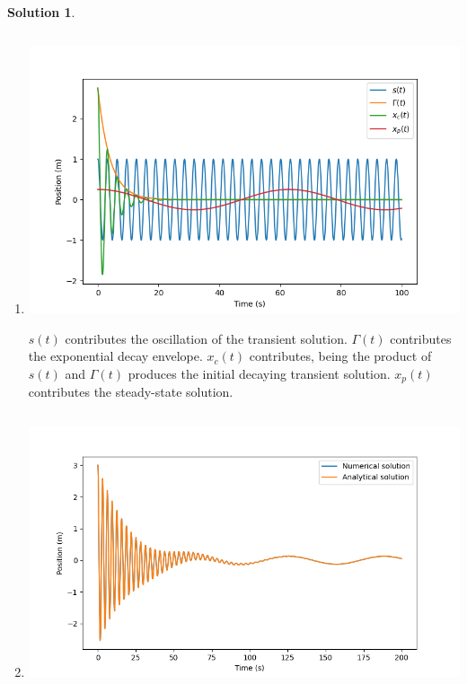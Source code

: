 \documentclass[10pt]{article}
\theoremstyle{definition}
\newtheorem{soln}{Solution}
\begin{document}
\begin{soln}
\begin{enumerate}[label=(\alph*)]
            \item \inputminted[breaklines, autogobble]{python3}{./python/q1/q1f.py}
                  \begin{center}
                        \includegraphics[scale=0.75]{Figure_3.png}
                  \end{center}
                  $s(t)$ contributes the oscillation of the transient solution. $\Gamma(t)$ contributes the exponential decay envelope. $x_c(t)$ contributes,
                  being the product of $s(t)$ and $\Gamma(t)$ produces the initial decaying transient solution. $x_p(t)$ contributes the steady-state solution.

            \item \inputminted[breaklines, autogobble]{python3}{./python/q1/q1g.py}
                  \begin{center}
                        \includegraphics[scale=0.75]{Figure_4.png}
                  \end{center}
      \end{enumerate}
\end{soln}
\newpage
\end{document}
